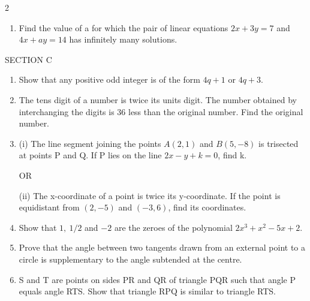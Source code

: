 \documentclass[10pt,a4paper]{article}
\begin{document}
\begin{multicols}{2}
\begin{enumerate}
\item Find the value of a for which the pair of linear equations  
$2x + 3y = 7$ and $4x + ay = 14$ has infinitely many solutions.
\end{enumerate}

\columnbreak

SECTION C

\begin{enumerate}
\item Show that any positive odd integer is of the form $4q + 1$ or $4q + 3$.

\item The tens digit of a number is twice its units digit. The number obtained
by interchanging the digits is 36 less than the original number.
Find the original number.

\item (i) The line segment joining the points $A(2,1)$ and $B(5,-8)$ is trisected
at points P and Q. If P lies on the line $2x - y + k = 0$, find k.

OR

(ii) The x-coordinate of a point is twice its y-coordinate. If the point is
equidistant from $(2,-5)$ and $(-3,6)$, find its coordinates.

\item Show that $1,\ 1/2$ and $-2$ are the zeroes of the polynomial  
$2x^3 + x^2 - 5x + 2$.

\item Prove that the angle between two tangents drawn from an external point
to a circle is supplementary to the angle subtended at the centre.

\item S and T are points on sides PR and QR of triangle PQR such that  
angle P equals angle RTS. Show that triangle RPQ is similar to triangle RTS.
\end{enumerate}

\end{multicols}
\end{document}
